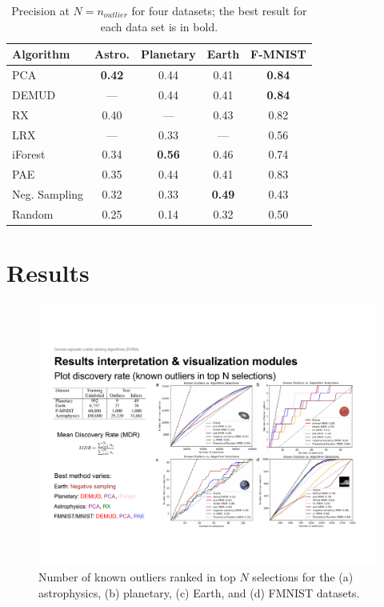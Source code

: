 \documentclass[utf8]{frontiersFPHY} %
\begin{document}
\begin{table}
\caption{Precision at $N=n_{outlier}$ for four datasets; the best result for each data set is in bold.}
\label{tab:faw_results}
\centering
\begin{tabular}{l|cccc}
  \toprule
  Algorithm & Astro. & Planetary & Earth & F-MNIST \\
  \midrule
  PCA               & \textbf{0.42} & 0.44 & 0.41 & \textbf{0.84} \\
  DEMUD             & --- & 0.44 & 0.41 & \textbf{0.84} \\
  \midrule
  RX                & 0.40 & --- & 0.43 & 0.82 \\
  LRX               & --- & 0.33 & --- & 0.56 \\
  \midrule
  iForest  & 0.34 & \textbf{0.56} & 0.46 & 0.74 \\
  \midrule
  PAE               & 0.35 & 0.44 & 0.41 & 0.83 \\
  Neg. Sampling & 0.32 & 0.33 & \textbf{0.49} & 0.43 \\
  \midrule
  Random            & 0.25 & 0.14 & 0.32 & 0.50 \\
  \bottomrule
\end{tabular}
\end{table}


\section{Results}


\begin{figure}
\centering
\includegraphics[width=\linewidth]{figures/combined_results.pdf}
\caption{Number of known outliers ranked in top $N$ selections for 
the (a) astrophysics, (b) planetary, (c) Earth, and (d) FMNIST datasets.}
\label{fig:combined_results}
\end{figure}
\end{document}
